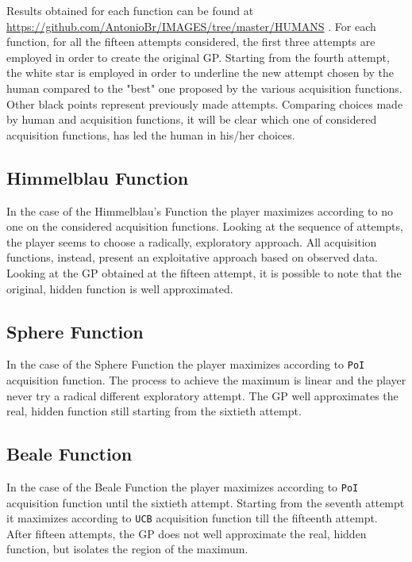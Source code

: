 Results obtained for each function can be found at \url{https://github.com/AntonioBr/IMAGES/tree/master/HUMANS} . For each function,  for all the fifteen attempts considered, the first three attempts are employed in order to create the original GP. Starting from the fourth attempt, the white star is employed in order to underline the new attempt chosen by the human compared to the "best" one proposed by the various acquisition functions. Other black points represent previously made attempts. Comparing choices made by human and acquisition functions, it will be clear which one of considered acquisition functions, has led the human in his/her choices.

\subsection{Himmelblau Function}
In the case of the Himmelblau's Function the player maximizes according to no one on the considered acquisition functions. Looking at the sequence of attempts, the player seems to choose a radically, exploratory approach. All acquisition functions, instead, present an exploitative approach based on observed data. Looking at the GP obtained at the fifteen attempt, it is possible to note that the original, hidden function is well approximated.

\subsection{Sphere Function}
In the case of the Sphere Function the player maximizes according to {\tt PoI} acquisition function. The process to achieve the maximum is linear and the player never try a radical different exploratory attempt. The GP well approximates the real, hidden function still starting from the sixtieth attempt.

\subsection{Beale Function}
In the case of the Beale Function the player maximizes according to {\tt PoI} acquisition function until the sixtieth attempt. Starting from the seventh attempt it maximizes according to {\tt UCB} acquisition function till the fifteenth attempt. After fifteen attempts, the GP does not well approximate the real, hidden function, but isolates the region of the maximum.

